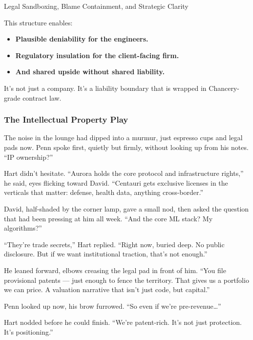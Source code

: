 \begin{TechnicalSidebar}{Legal Sandboxing, Blame Containment, and Strategic Clarity}
  \medskip
  
  This structure enables:

  \medskip
  
  \begin{itemize}
  \item \textbf{Plausible deniability for the engineers.}  
  \item \textbf{Regulatory insulation for the client-facing firm.}  
  \item \textbf{And shared upside without shared liability.}
  \end{itemize}

  \medskip
  
  It’s not just a company. It’s a liability boundary that is wrapped in Chancery-grade contract law.
  
\end{TechnicalSidebar}

\medskip

\subsubsection{The Intellectual Property Play}

The noise in the lounge had dipped into a murmur, just espresso cups and legal pads now. Penn spoke first, quietly but 
firmly, without looking up from his notes. “IP ownership?”

Hart didn’t hesitate. “Aurora holds the core protocol and infrastructure rights,” he said, eyes flicking toward David. 
“Centauri gets exclusive licenses in the verticals that matter: defense, health data, anything cross-border.”

David, half-shaded by the corner lamp, gave a small nod, then asked the question that had been pressing at him all week. 
“And the core ML stack? My algorithms?”

“They’re trade secrets,” Hart replied. “Right now, buried deep. No public disclosure. But if we want institutional traction, 
that’s not enough.”

He leaned forward, elbows creasing the legal pad in front of him. “You file provisional patents — just enough to fence the 
territory. That gives us a portfolio we can price. A valuation narrative that isn’t just code, but capital.”

Penn looked up now, his brow furrowed. “So even if we’re pre-revenue…”

Hart nodded before he could finish. “We’re patent-rich. It’s not just protection. It’s positioning.”

